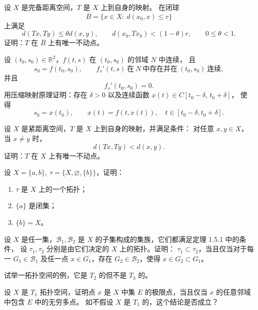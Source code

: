 \begin{homework}[1.18]
设 $X$ 是完备距离空间，$T$ 是 $X$ 上到自身的映射。  
在闭球 
\[
\overline{B}=\{x\in X:\ d(x_0,x)\le r\}
\]
上满足
\[
d(Tx,Ty)\le \theta d(x,y),\qquad d(x_0,Tx_0)<(1-\theta)r,\qquad 0\le \theta<1.
\]
证明：$T$ 在 $\overline{B}$ 上有唯一不动点。
\end{homework}

\begin{homework}[1.19]
设 $(t_0,s_0)\in\mathbb{R}^2$，$f(t,s)$ 在 $(t_0,s_0)$ 的邻域 $N$ 中连续，  
且  
\[
s_0 = f(t_0,s_0),\qquad f_s'(t,s)\ \text{在}\ N\ \text{中存在并在}\ (t_0,s_0)\ \text{连续},
\]
并且
\[
f_s'(t_0,s_0)=0.
\]
用压缩映射原理证明：存在 $\delta>0$ 以及连续函数 $x(t)\in C[t_0-\delta,\, t_0+\delta]$，
使得
\[
s_0=x(t_0),\qquad x(t)=f(t,x(t)),\quad t\in[t_0-\delta,t_0+\delta].
\]
\end{homework}

\begin{homework}[1.20]
设 $X$ 是紧距离空间，$T$ 是 $X$ 上到自身的映射，并满足条件：  
对任意 $x,y\in X$，当 $x\ne y$ 时，
\[
d(Tx,Ty)<d(x,y).
\]
证明：$T$ 在 $X$ 上有唯一不动点。
\end{homework}
\begin{homework}[1.21]
设 $X=\{a,b\},\ \tau=\{X,\varnothing,\{b\}\}$，证明：
\begin{enumerate}
    \item $\tau$ 是 $X$ 上的一个拓扑；
    \item $\{a\}$ 是闭集；
    \item $\overline{\{b\}}=X$。
\end{enumerate}
\end{homework}

\begin{homework}[1.22]
设 $X$ 是任一集，$\mathcal{B}_1,\mathcal{B}_2$ 是 $X$ 的子集构成的集族，它们都满足定理 1.5.1 中的条件，
设 $\tau_1,\tau_2$ 分别是由它们决定的 $X$ 上的拓扑。证明：  
$\tau_1 \subset \tau_2$，当且仅当对于每一 $G_1\in \mathcal{B}_1$ 及任一点 $x\in G_1$，存在 $G_2\in \mathcal{B}_2$，使得 $x\in G_2\subset G_1$。
\end{homework}

\begin{homework}[1.23]
试举一拓扑空间的例，它是 $T_2$ 的但不是 $T_3$ 的。
\end{homework}

\begin{homework}[1.24]
设 $X$ 是 $T_1$ 拓扑空间，证明点 $x$ 是 $X$ 中集 $E$ 的极限点，当且仅当 $x$ 的任意邻域中包含 $E$ 中的无穷多点。  
如不假设 $X$ 是 $T_1$ 的，这个结论是否成立？
\end{homework}

